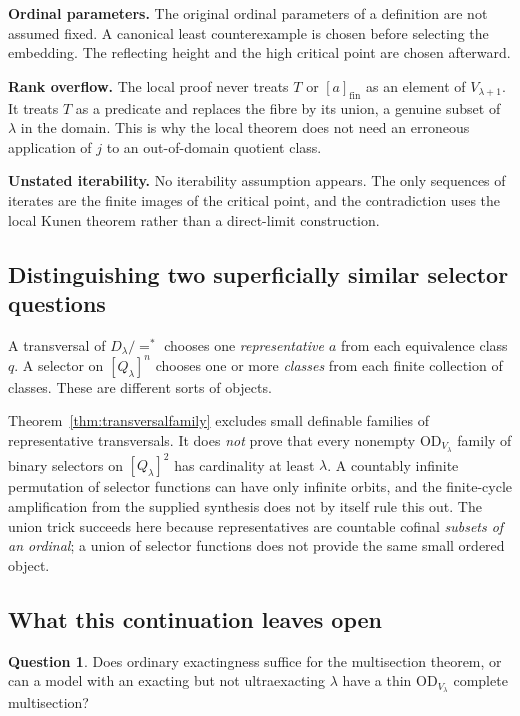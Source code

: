 \documentclass[11pt,letterpaper]{article}
\theoremstyle{definition}
\newtheorem{question}[definition]{Question}
\numberwithin{equation}{section}
\newcommand{\OD}{\mathrm{OD}}
\newcommand{\eqfin}{\mathrel{=^{*}}}
\newcommand{\cl}[1]{[#1]_{\mathrm{fin}}}
\begin{document}
\textbf{Ordinal parameters.}
The original ordinal parameters of a definition are not assumed fixed. A canonical least counterexample is chosen before selecting the embedding. The reflecting height and the high critical point are chosen afterward.

\textbf{Rank overflow.}
The local proof never treats $T$ or $\cl a$ as an element of $V_{\lambda+1}$. It treats $T$ as a predicate and replaces the fibre by its union, a genuine subset of $\lambda$ in the domain. This is why the local theorem does not need an erroneous application of $j$ to an out-of-domain quotient class.

\textbf{Unstated iterability.}
No iterability assumption appears. The only sequences of iterates are the finite images of the critical point, and the contradiction uses the local Kunen theorem rather than a direct-limit construction.

\subsection{Distinguishing two superficially similar selector questions}

A transversal of $D_\lambda/{\eqfin}$ chooses one \emph{representative $a$} from each equivalence class $q$. A selector on $[Q_\lambda]^n$ chooses one or more \emph{classes} from each finite collection of classes. These are different sorts of objects.

Theorem~\ref{thm:transversalfamily} excludes small definable families of representative transversals. It does \emph{not} prove that every nonempty $\OD_{V_\lambda}$ family of binary selectors on $[Q_\lambda]^2$ has cardinality at least $\lambda$. A countably infinite permutation of selector functions can have only infinite orbits, and the finite-cycle amplification from the supplied synthesis does not by itself rule this out. The union trick succeeds here because representatives are countable cofinal \emph{subsets of an ordinal}; a union of selector functions does not provide the same small ordered object.

\subsection{What this continuation leaves open}

\begin{question}
Does ordinary exactingness suffice for the multisection theorem, or can a model with an exacting but not ultraexacting $\lambda$ have a thin $\OD_{V_\lambda}$ complete multisection?
\end{question}
\end{document}
